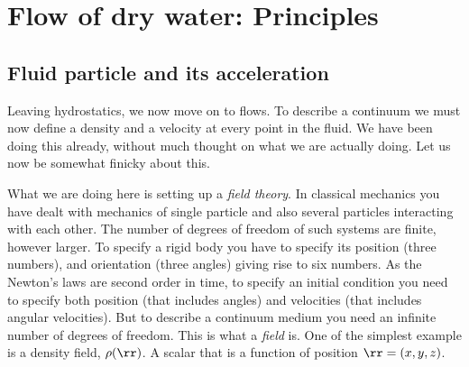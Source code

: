 \chapter{Flow of dry water: Principles}
\label{ch:dry}
\section{Fluid particle and its acceleration}
Leaving hydrostatics, we now move on to flows.  To describe a
continuum we must now define a density and a velocity at every point
in the fluid. We have been doing this already, without much thought on
what we are actually doing. Let us now be somewhat finicky about
this.  

What we are doing here is setting up a \textit{field theory}. In
classical mechanics you have dealt with mechanics of single particle
and also several particles interacting with each other. The number of
degrees of freedom of such systems are finite, however larger.  To
specify a rigid body you have to specify its position (three numbers),
and orientation (three angles) giving rise to six numbers. As the
Newton's laws are second order in time, to specify an initial
condition you need to specify both position (that includes angles) and
velocities (that includes angular velocities). But to describe a
continuum medium you need an infinite number of degrees of
freedom. This is what a \textit{field} is.  One of the simplest
example is a density field, $\rho(\rr)$. A scalar that is a function
of position $\rr = (x,y,z)$.  
